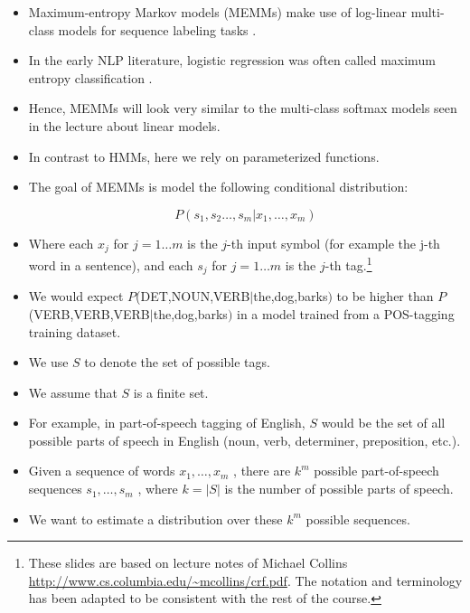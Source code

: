 \begin{itemize}

\item Maximum-entropy Markov models (MEMMs) make use of log-linear multi-class models for sequence labeling tasks \cite{mccallum2000maximum}.
 
 \item In the early NLP literature, logistic regression was often called maximum entropy classification \cite{jacobbook}.
 
 \item Hence, MEMMs will look very similar to the multi-class softmax models seen in the lecture about linear models. 
 
  \item In contrast to HMMs, here we rely on parameterized functions.


 \item The goal of MEMMs is  model the following conditional distribution:
 
 \begin{displaymath}
  P(s_1,s_2 \dots, s_m | x_1, \dots, x_m)
 \end{displaymath}

 \item Where each $x_j$ for $j = 1 \dots m$ is the $j$-th input symbol (for example the j-th word in a sentence), and each $s_j$ for $j = 1 \dots m$ is the $j$-th tag.\footnote{These slides are based on lecture notes of Michael Collins \url{http://www.cs.columbia.edu/~mcollins/crf.pdf}. The notation and terminology has been adapted to be consistent with the rest of the course.}

\item We would expect $P$(DET,NOUN,VERB$|$the,dog,barks$)$ to be higher than $P$(VERB,VERB,VERB$|$the,dog,barks$)$ in a model trained from a POS-tagging training dataset.
 
\item We use $S$ to denote the set of possible tags.
\item We assume that $S$ is a finite set. 
 \item For example, in part-of-speech tagging of English, $S$ would be the set of all possible parts of speech in English (noun, verb, determiner, preposition, etc.).
 \item Given a sequence of words $x_1, \dots, x_m$ , there are $k^m$ possible part-of-speech sequences $s_1, \dots, s_m$ , where $k = |S|$ is the number of possible parts of speech.
 \item We want to estimate a distribution over these $k^m$ possible sequences.


\end{itemize}
